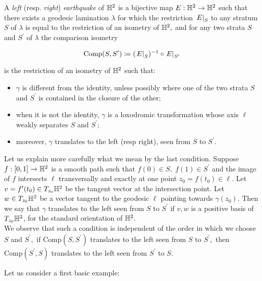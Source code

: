 \begin{definition}
    A \textit{left} (resp. \textit{right}) \textit{earthquake} of $\mathbb{H}^2$ is a bijective map $E:\mathbb{H}^2\to\mathbb{H}^2$ such that there exists a geodesic lamination $\lambda$ for which the restriction $\left.E\right|_{S}$ to any stratum $S$ of $\lambda$ is equal to the restriction of an isometry of $\mathbb{H}^2,$ and for any two strata $S$ and $S^{\prime}$ of $\lambda$ the comparison isometry 
    
    \[
        \text{Comp}(S,S^{\prime})\coloneqq (\left.E\right|_{S})^{-1}\circ \left.E\right|_{S^{\prime} }
    \]

    is the restriction of an isometry of $\mathbb{H}^2$ such that:
    \begin{itemize}
        \item $\gamma$ is different from the identity, unless possibly where one of the two strata $S$ and $S^{\prime}$ is contained in the closure of the other;
        \item when it is not the identity, $\gamma$ is a loxodromic transformation whose axis $\ell$ weakly separates $S$ and $S^{\prime};$
        \item moreover, $\gamma$ translates to the left (resp right), seen from $S$ to $S^{\prime}$. 
    \end{itemize}
\end{definition}

Let us explain more carefully what we mean by the last condition. Suppose $f:[0,1]\to\mathbb{H}^2$ is a smooth path such that $f(0)\in S,\;f(1)\in S^{\prime}$ and the image of $f$ intersects $\ell$ transversally and exactly at one point $z_0=f(t_0)\in\ell.$ Let $v=f^{\prime}(t_0)\in T_{z_0}\mathbb{H}^2$ be the tangent vector at the intersection point. Let $w\in T_{z_0}\mathbb{H}^2$ be a vector tangent to the geodesic $\ell$ pointing towards $\gamma(z_0).$ Then we say that $\gamma$ translates to the left seen from $S$ to $S^{\prime} $ if $v,w$ is a positive basis of $T_{z_0}\mathbb{H}^2$, for the standard orientation of $\mathbb{H}^2.$\\
We observe that such a condition is independent of the order in which we choose $S$ and $S^{\prime},$  if $\text{Comp}(S,S^{\prime})$ translates to the left seen from $S$ to $S^{\prime},$ then $\text{Comp}(S^{\prime} ,S)$ translates to the left seen from $S^{\prime} $ to $S.$ 

Let us consider a first basic example: 

